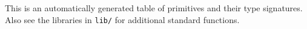 \documentclass[twocolumn]{report}
\newcommand{\cde}{\tt}
\begin{document}
This is an automatically generated table of primitives and their type
signatures.  Also see the libraries in {\cde lib/} for
additional standard functions.

{
\scriptsize

}



\end{document}
